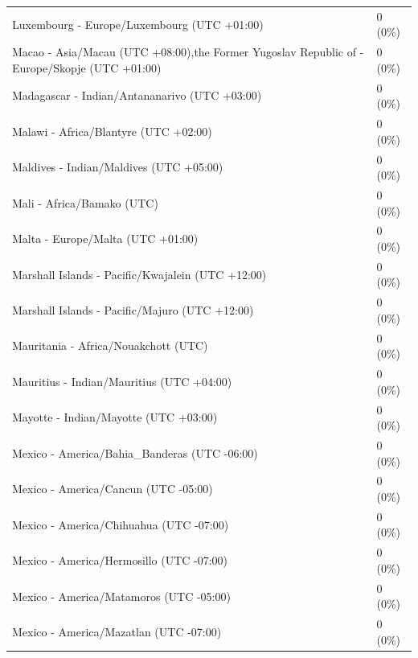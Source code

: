 \documentclass[
  english,
  man]{apa6}
\begin{document}
\begin{appendix}
\begin{table}
{\begin{tabular}[t]{ll}
\hspace{1em}Luxembourg - Europe/Luxembourg (UTC +01:00) & 0 (0\%)\\
\addlinespace
\hspace{1em}Macao - Asia/Macau (UTC +08:00),the Former Yugoslav Republic of - Europe/Skopje (UTC +01:00) & 0 (0\%)\\
\hspace{1em}Madagascar - Indian/Antananarivo (UTC +03:00) & 0 (0\%)\\
\hspace{1em}Malawi - Africa/Blantyre (UTC +02:00) & 0 (0\%)\\
\hspace{1em}Maldives - Indian/Maldives (UTC +05:00) & 0 (0\%)\\
\hspace{1em}Mali - Africa/Bamako (UTC) & 0 (0\%)\\
\addlinespace
\hspace{1em}Malta - Europe/Malta (UTC +01:00) & 0 (0\%)\\
\hspace{1em}Marshall Islands - Pacific/Kwajalein (UTC +12:00) & 0 (0\%)\\
\hspace{1em}Marshall Islands - Pacific/Majuro (UTC +12:00) & 0 (0\%)\\
\hspace{1em}Mauritania - Africa/Nouakchott (UTC) & 0 (0\%)\\
\hspace{1em}Mauritius - Indian/Mauritius (UTC +04:00) & 0 (0\%)\\
\addlinespace
\hspace{1em}Mayotte - Indian/Mayotte (UTC +03:00) & 0 (0\%)\\
\hspace{1em}Mexico - America/Bahia\_Banderas (UTC -06:00) & 0 (0\%)\\
\hspace{1em}Mexico - America/Cancun (UTC -05:00) & 0 (0\%)\\
\hspace{1em}Mexico - America/Chihuahua (UTC -07:00) & 0 (0\%)\\
\hspace{1em}Mexico - America/Hermosillo (UTC -07:00) & 0 (0\%)\\
\addlinespace
\hspace{1em}Mexico - America/Matamoros (UTC -05:00) & 0 (0\%)\\
\hspace{1em}Mexico - America/Mazatlan (UTC -07:00) & 0 (0\%)\\

\end{tabular}}
\end{table}
\end{appendix}
\end{document}
